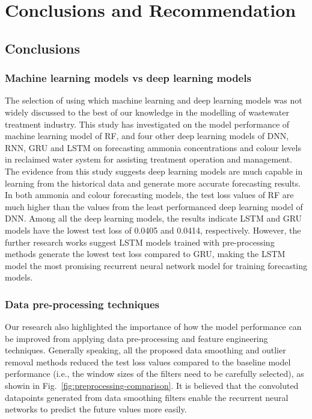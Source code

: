 \chapter{Conclusions and Recommendation}
\section{Conclusions}
\subsection{Machine learning models vs deep learning models}
The selection of using which machine learning and deep learning models was not widely discussed to the best of our knowledge in the modelling of wastewater treatment industry. This study has investigated on the model performance of machine learning model of RF, and four other deep learning models of DNN, RNN, GRU and LSTM on forecasting ammonia concentrations and colour levels in reclaimed water system for assisting treatment operation and management. The evidence from this study suggests deep learning models are much capable in learning from the historical data and generate more accurate forecasting results. In both ammonia and colour forecasting models, the test loss values of RF are much higher than the values from the least performanced deep learning model of DNN. Among all the deep learning models, the results indicate LSTM and GRU models have the lowest test loss of 0.0405 and 0.0414, respectively. However, the further research works suggest LSTM models trained with pre-processing methods generate the lowest test loss compared to GRU, making the LSTM model the most promising recurrent neural network model for training forecasting models.

\subsection{Data pre-processing techniques}
Our research also highlighted the importance of how the model performance can be improved from applying data pre-processing and feature engineering techniques. Generally speaking, all the proposed data smoothing and outlier removal methods reduced the test loss values compared to the baseline model performance (i.e., the window sizes of the filters need to be carefully selected), as showin in Fig.~\ref{fig:preprocessing-comparison}. It is believed that the convoluted datapoints generated from data smoothing filters enable the recurrent neural networks to predict the future values more easily.

